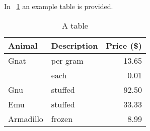In \tablename~\ref{tbl:aTable} an example table is provided. 

\begin{table}[htb]
\centering
\begin{tabular}{|llr|}
\hline
Animal    & Description & Price (\$) \\\hline
Gnat      & per gram    & 13.65      \\\hline
          & each        & 0.01       \\\hline
Gnu       & stuffed     & 92.50      \\\hline
Emu       & stuffed     & 33.33      \\\hline
Armadillo & frozen      & 8.99       \\\hline
\end{tabular}
\caption{A table}
\label{tbl:aTable}
\end{table}